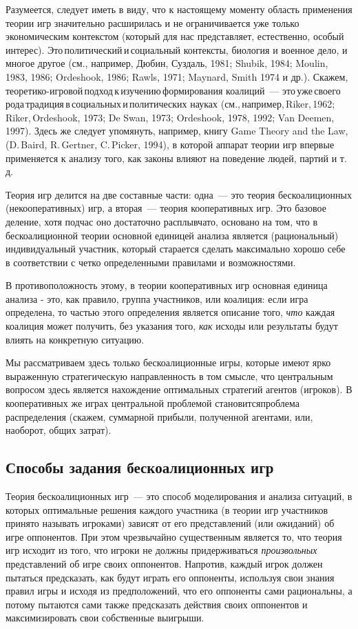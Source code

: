 Разумеется, следует иметь в виду, что к настоящему моменту область
применения теории игр значительно расширилась и не ограничивается
уже только экономическим контекстом (который для нас представляет,
естественно, особый
интерес). Это\,политический\,и\,социальный контексты, биология и
военное дело, и многое другое (см., например, Дюбин, Суздаль, 1981;
Shubik, 1984; Moulin, 1983, 1986; Ordeshook, 1986; Rawls, 1971;
Maynard, Smith 1974 и др.).
Скажем,\,теоретико-игровой\,подход\,к\,изучению\,фор\-ми\-ро\-ва\-ния
коалиций~---
это\,уже\,своего\,рода\,традиция\,в\,социальных\,и\,по\-ли\-тических
науках (см.,\,например,\,Riker,\,1962;\,Riker,\,Or\-des\-hook, 1973;
De Swan, 1973; Or\-des\-hook, 1978, 1992; Van Deemen, 1997). Здесь
же следует упомянуть, например, книгу Game Theory and the Law,
(D.\,Baird, R.\,Gertner, C.\,Picker, 1994), в которой аппарат теории
игр впервые применяется к анализу того, как законы влияют на
поведение людей, партий и т.\,д.
\smallskip

Теория игр делится на две составные части: одна~--- это теория
бескоалиционных (некооперативных) игр, а вторая~--- теория
кооперативных игр. Это базовое деление, хотя подчас оно достаточно
расплывчато, основано на том, что в бескоалиционной теории основной
единицей анализа является (рациональный) индивидуальный участник,
который старается сделать максимально хорошо себе в соответствии с
четко определенными правилами и возможностями.

В противоположность этому, в теории кооперативных игр основная
единица анализа - это, как правило, группа участников, или коалиция:
если игра определена, то частью этого определения является описание
того, \emph{что} каждая коалиция может получить, без указания того,
\emph{как} исходы или результаты будут влиять на конкретную
ситуацию.

Мы рассматриваем здесь только бескоалиционные игры, которые имеют
ярко выраженную стратегическую направленность в том смысле, что
центральным вопросом здесь является нахождение оптимальных
стратегий агентов (игроков). В кооперативных же играх центральной
проблемой становитсяпроблема распределения (скажем, суммарной прибыли,
полученной агентами, или, наоборот, общих затрат).

\subsection{Способы задания бескоалиционных игр}


Теория бескоалиционных игр~--- это способ моделирования и анализа
ситуаций, в которых оптимальные решения каждого участника (в теории
игр участников принято называть  игроками) зависят от его
представлений (или ожиданий) об игре оппонентов. При этом чрезвычайно
существенным является то, что теория игр исходит из того, что
игроки не должны придерживаться
{\it произвольных} представлений об игре своих оппонентов. Напротив,
каждый игрок должен пытаться предсказать, как будут играть его оппоненты,
используя свои знания правил игры и исходя из предположений, что его
оппоненты сами рациональны, а потому пытаются сами также предсказать
действия своих оппонентов и максимизировать свои собственные выигрыши.


